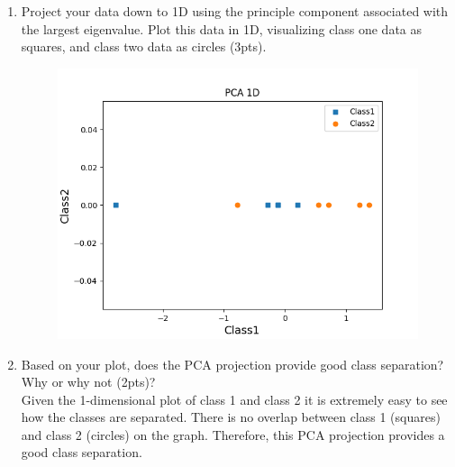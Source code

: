 \documentclass[12pt]{article}
\begin{document}
\begin{enumerate}
\begin{enumerate}
\begin{enumerate}
        	\end{enumerate}
            \item Project your data down to 1D using the principle component associated with the largest eigenvalue.  Plot this data in 1D, visualizing class one data as squares, and class two data as circles (3pts).
            \begin{figure}[H]
                \begin{center}
                \includegraphics{images/theory_pca_1d.png}
                \label{GD}
                \end{center}
            \end{figure}
        	\item Based on your plot, does the PCA projection provide good class separation?  Why or why not (2pts)? \\
        	Given the 1-dimensional plot of class 1 and class 2 it is extremely easy to see how the classes are separated. There is no overlap between class 1 (squares) and class 2 (circles) on the graph. Therefore, this PCA projection provides a good class separation.
        	
    	\end{enumerate}
    	

\end{enumerate}
\end{document}
